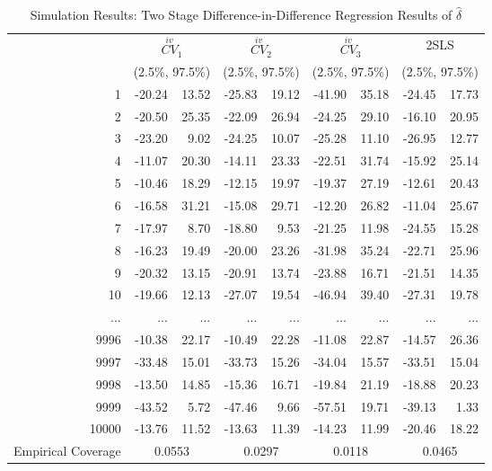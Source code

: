 \begin{table}[ht]
    \caption{Simulation Results: Two Stage Difference-in-Difference Regression Results of $\hat{\delta}$}
    \centering
    \begin{tabular}{rrrrrrrrr}
      \hline
      &\multicolumn{2}{c}{$\overset{iv}{CV}_{1}$} &\multicolumn{2}{c}{$\overset{iv}{CV}_{2}$} &\multicolumn{2}{c}{$\overset{iv}{CV}_{3}$} &\multicolumn{2}{c}{2SLS} \\
      &\multicolumn{2}{c}{(2.5\%, 97.5\%)} &\multicolumn{2}{c}{(2.5\%, 97.5\%)} &\multicolumn{2}{c}{(2.5\%, 97.5\%)} &\multicolumn{2}{c}{(2.5\%, 97.5\%)}\\
      \hline
    1 & -20.24 & 13.52 & -25.83 & 19.12 & -41.90 & 35.18 & -24.45 & 17.73 \\ 
      2 & -20.50 & 25.35 & -22.09 & 26.94 & -24.25 & 29.10 & -16.10 & 20.95 \\ 
      3 & -23.20 & 9.02 & -24.25 & 10.07 & -25.28 & 11.10 & -26.95 & 12.77 \\ 
      4 & -11.07 & 20.30 & -14.11 & 23.33 & -22.51 & 31.74 & -15.92 & 25.14 \\ 
      5 & -10.46 & 18.29 & -12.15 & 19.97 & -19.37 & 27.19 & -12.61 & 20.43 \\ 
      6 & -16.58 & 31.21 & -15.08 & 29.71 & -12.20 & 26.82 & -11.04 & 25.67 \\ 
      7 & -17.97 & 8.70 & -18.80 & 9.53 & -21.25 & 11.98 & -24.55 & 15.28 \\ 
      8 & -16.23 & 19.49 & -20.00 & 23.26 & -31.98 & 35.24 & -22.71 & 25.96 \\ 
      9 & -20.32 & 13.15 & -20.91 & 13.74 & -23.88 & 16.71 & -21.51 & 14.35 \\ 
      10 & -19.66 & 12.13 & -27.07 & 19.54 & -46.94 & 39.40 & -27.31 & 19.78 \\
      ... & ... & ... & ... & ... & ... & ... & ... & ... \\
      9996 & -10.38 & 22.17 & -10.49 & 22.28 & -11.08 & 22.87 & -14.57 & 26.36 \\ 
      9997 & -33.48 & 15.01 & -33.73 & 15.26 & -34.04 & 15.57 & -33.51 & 15.04 \\ 
      9998 & -13.50 & 14.85 & -15.36 & 16.71 & -19.84 & 21.19 & -18.88 & 20.23 \\ 
      9999 & -43.52 & 5.72 & -47.46 & 9.66 & -57.51 & 19.71 & -39.13 & 1.33 \\ 
      10000 & -13.76 & 11.52 & -13.63 & 11.39 & -14.23 & 11.99 & -20.46 & 18.22 \\ 
       \hline
      Empirical Coverage & \multicolumn{2}{c}{0.0553} &\multicolumn{2}{c}{0.0297} &\multicolumn{2}{c}{0.0118} &\multicolumn{2}{c}{0.0465} \\
      \hline
    \end{tabular}
\end{table} 